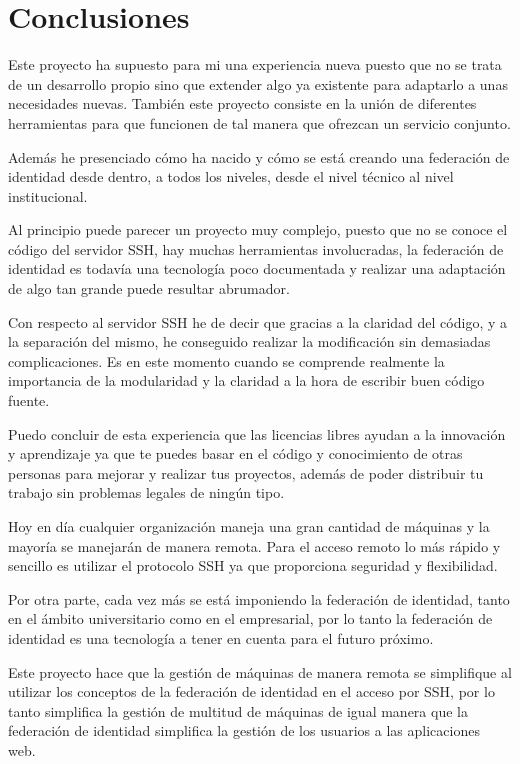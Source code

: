 \chapter{Conclusiones}

Este proyecto ha supuesto para mi una experiencia nueva puesto que no se
trata de un desarrollo propio sino que extender algo ya existente para
adaptarlo a unas necesidades nuevas. También este proyecto consiste en
la unión de diferentes herramientas para que funcionen de tal manera
que ofrezcan un servicio conjunto.

Además he presenciado cómo ha nacido y cómo se está creando una
federación de identidad desde dentro, a todos los niveles, desde el
nivel técnico al nivel institucional.

Al principio puede parecer un proyecto muy complejo, puesto que no se
conoce el código del servidor SSH, hay muchas herramientas
involucradas, la federación de identidad es todavía una tecnología
poco documentada y realizar una adaptación de algo tan
grande puede resultar abrumador.

Con respecto al servidor SSH he de decir que gracias a la claridad del
código, y a la separación del mismo, he conseguido realizar la
modificación sin demasiadas complicaciones. Es en este momento cuando
se comprende realmente la importancia de la modularidad y la claridad
a la hora de escribir buen código fuente.

Puedo concluir de esta experiencia que las licencias libres ayudan a la
innovación y aprendizaje ya que te puedes basar en el código y
conocimiento de otras personas para mejorar y realizar tus proyectos,
además de poder distribuir tu trabajo sin problemas legales de ningún
tipo.

Hoy en día cualquier organización maneja una gran cantidad de máquinas y
la mayoría se manejarán de manera remota. Para el acceso remoto lo más
rápido y sencillo es utilizar el protocolo SSH ya que proporciona
seguridad y flexibilidad.

Por otra parte, cada vez más se está imponiendo la federación de identidad,
tanto en el ámbito universitario como en el empresarial, por lo tanto la
federación de identidad es una tecnología a tener en cuenta para el futuro
próximo.

Este proyecto hace que la gestión de máquinas de manera remota se
simplifique al utilizar los conceptos de la federación de identidad en el
acceso por SSH, por lo tanto simplifica la gestión de multitud de máquinas
de igual manera que la federación de identidad simplifica la gestión de los
usuarios a las aplicaciones web.

